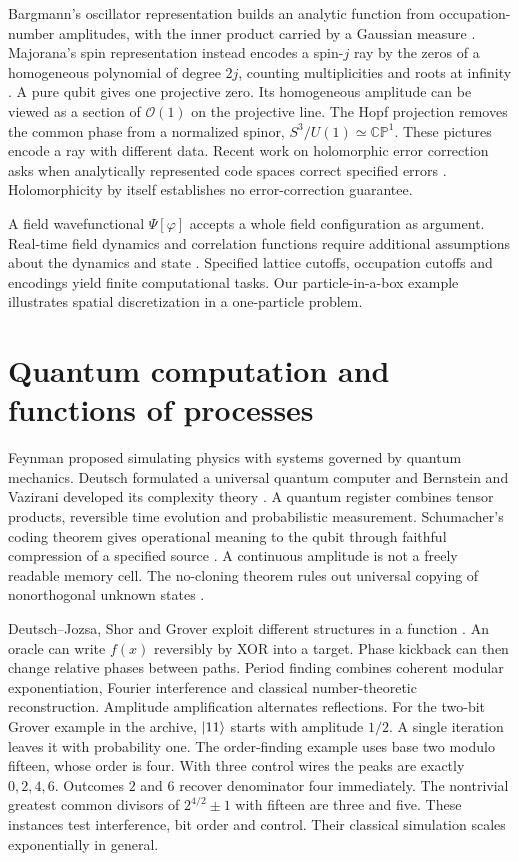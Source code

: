 Bargmann's oscillator representation builds an analytic function from occupation-number amplitudes, with the inner product carried by a Gaussian measure \cite{bargmann}. Majorana's spin representation instead encodes a spin-$j$ ray by the zeros of a homogeneous polynomial of degree $2j$, counting multiplicities and roots at infinity \cite{majorana}. A pure qubit gives one projective zero. Its homogeneous amplitude can be viewed as a section of $\mathcal O(1)$ on the projective line. The Hopf projection removes the common phase from a normalized spinor, $S^3/U(1)\simeq\mathbb{CP}^1$. These pictures encode a ray with different data. Recent work on holomorphic error correction asks when analytically represented code spaces correct specified errors \cite{holocode}. Holomorphicity by itself establishes no error-correction guarantee.

A field wavefunctional $\Psi[\varphi]$ accepts a whole field configuration as argument. Real-time field dynamics and correlation functions require additional assumptions about the dynamics and state \cite{field}. Specified lattice cutoffs, occupation cutoffs and encodings yield finite computational tasks. Our particle-in-a-box example illustrates spatial discretization in a one-particle problem.

\section{Quantum computation and functions of processes}
Feynman proposed simulating physics with systems governed by quantum mechanics. Deutsch formulated a universal quantum computer and Bernstein and Vazirani developed its complexity theory \cite{feynman,deutsch,bv}. A quantum register combines tensor products, reversible time evolution and probabilistic measurement. Schumacher's coding theorem gives operational meaning to the qubit through faithful compression of a specified source \cite{schumacher}. A continuous amplitude is not a freely readable memory cell. The no-cloning theorem rules out universal copying of nonorthogonal unknown states \cite{noclone}.

Deutsch--Jozsa, Shor and Grover exploit different structures in a function \cite{dj,shor,grover}. An oracle can write $f(x)$ reversibly by XOR into a target. Phase kickback can then change relative phases between paths. Period finding combines coherent modular exponentiation, Fourier interference and classical number-theoretic reconstruction. Amplitude amplification alternates reflections. For the two-bit Grover example in the archive, $\lvert 11\rangle$ starts with amplitude $1/2$. A single iteration leaves it with probability one. The order-finding example uses base two modulo fifteen, whose order is four. With three control wires the peaks are exactly $0,2,4,6$. Outcomes $2$ and $6$ recover denominator four immediately. The nontrivial greatest common divisors of $2^{4/2}\pm1$ with fifteen are three and five. These instances test interference, bit order and control. Their classical simulation scales exponentially in general.

